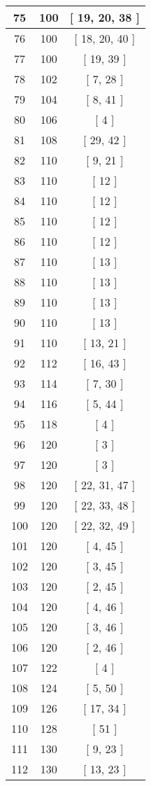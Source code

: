 \begin{center}
\begin{longtable}[H]{|| c c c ||}
75 & 100 & [ 19, 20, 38 ]
\\\hline
76 & 100 & [ 18, 20, 40 ]
\\\hline
77 & 100 & [ 19, 39 ]
\\\hline
78 & 102 & [ 7, 28 ]
\\\hline
79 & 104 & [ 8, 41 ]
\\\hline
80 & 106 & [ 4 ]
\\\hline
81 & 108 & [ 29, 42 ]
\\\hline
82 & 110 & [ 9, 21 ]
\\\hline
83 & 110 & [ 12 ]
\\\hline
84 & 110 & [ 12 ]
\\\hline
85 & 110 & [ 12 ]
\\\hline
86 & 110 & [ 12 ]
\\\hline
87 & 110 & [ 13 ]
\\\hline
88 & 110 & [ 13 ]
\\\hline
89 & 110 & [ 13 ]
\\\hline
90 & 110 & [ 13 ]
\\\hline
91 & 110 & [ 13, 21 ]
\\\hline
92 & 112 & [ 16, 43 ]
\\\hline
93 & 114 & [ 7, 30 ]
\\\hline
94 & 116 & [ 5, 44 ]
\\\hline
95 & 118 & [ 4 ]
\\\hline
96 & 120 & [ 3 ]
\\\hline
97 & 120 & [ 3 ]
\\\hline
98 & 120 & [ 22, 31, 47 ]
\\\hline
99 & 120 & [ 22, 33, 48 ]
\\\hline
100 & 120 & [ 22, 32, 49 ]
\\\hline
101 & 120 & [ 4, 45 ]
\\\hline
102 & 120 & [ 3, 45 ]
\\\hline
103 & 120 & [ 2, 45 ]
\\\hline
104 & 120 & [ 4, 46 ]
\\\hline
105 & 120 & [ 3, 46 ]
\\\hline
106 & 120 & [ 2, 46 ]
\\\hline
107 & 122 & [ 4 ]
\\\hline
108 & 124 & [ 5, 50 ]
\\\hline
109 & 126 & [ 17, 34 ]
\\\hline
110 & 128 & [ 51 ]
\\\hline
111 & 130 & [ 9, 23 ]
\\\hline
112 & 130 & [ 13, 23 ]

\end{longtable}
\end{center}
